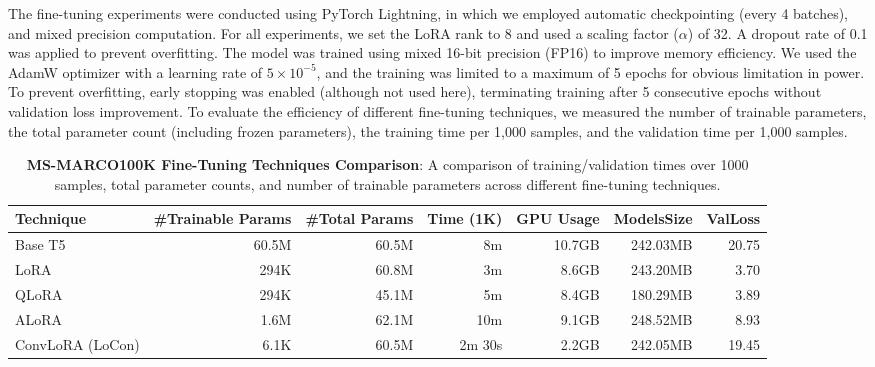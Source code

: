 The fine-tuning experiments were conducted using PyTorch Lightning, in which we employed automatic checkpointing (every 4 batches), and mixed precision computation. For all experiments, we set the LoRA rank to 8 and used a scaling factor (\(\alpha\)) of 32. A dropout rate of 0.1 was applied to prevent overfitting. The model was trained using mixed 16-bit precision (FP16) to improve memory efficiency. We used the AdamW optimizer with a learning rate of \(5 \times 10^{-5}\), and the training was limited to a maximum of 5 epochs for obvious limitation in power. To prevent overfitting, early stopping was enabled (although not used here), terminating training after 5 consecutive epochs without validation loss improvement. 
To evaluate the efficiency of different fine-tuning techniques, we measured the number of trainable parameters, the total parameter count (including frozen parameters), the training time per 1,000 samples, and the validation time per 1,000 samples.

\begin{table}[ht]
    \centering
    \small
    \begin{tabular}{l|rrrrrr}
    \toprule
    \textbf{Technique} & \textbf{\#Trainable Params} & \textbf{\#Total Params} & \textbf{Time (1K)} & \textbf{GPU Usage} & \textbf{ModelsSize} & \textbf{ValLoss} \\
    \midrule
    Base T5         & 60.5M & 60.5M & 8m & 10.7GB & 242.03MB & 20.75\\
    LoRA            & 294K & 60.8M & 3m & 8.6GB & 243.20MB & 3.70\\
    QLoRA           & 294K & 45.1M & 5m & 8.4GB & 180.29MB & 3.89\\
    ALoRA           & 1.6M & 62.1M & 10m & 9.1GB & 248.52MB & 8.93\\
    ConvLoRA (LoCon)& 6.1K & 60.5M & 2m 30s & 2.2GB & 242.05MB & 19.45\\
    \bottomrule
    \end{tabular}
    \caption{\textbf{MS-MARCO100K Fine-Tuning Techniques Comparison}: A comparison of training/validation times over 1000 samples, total parameter counts, and number of trainable parameters across different fine-tuning techniques.}
    \label{tab:results_comparison}
\end{table}


